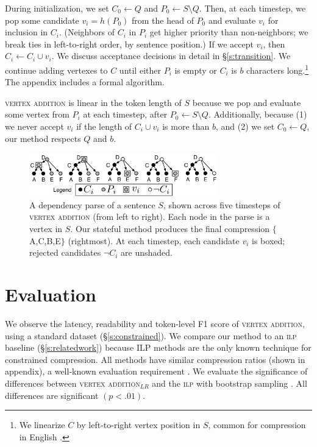 \documentclass[11pt,a4paper]{article}
\begin{document}
During initialization, we set $C_0 \gets Q$ and $P_0 \gets S \setminus Q$. Then, at each timestep, we pop some candidate $v_i =h(P_0)$ from the head of $P_0$ and evaluate $v_i$ for inclusion in $C_i$. (Neighbors of $C_i$ in $P_i$ get higher priority than non-neighbors; we break ties in left-to-right order, by sentence position.) If we accept $v_i$, then $C_i \gets C_i \cup v_i$. We discuss acceptance decisions in detail in \S\ref{s:transition}. We continue adding vertexes to $C$ until either $P_i$ is empty or $C_i$ is $b$ characters long.\footnote{We linearize $C$ by left-to-right vertex position in $S$, common for compression in English \cite{filippova2013overcoming}.} The appendix includes a formal algorithm. 

\textsc{vertex addition} is linear in the token length of $S$ because we pop and evaluate some vertex from $P_i$ at each timestep, after $P_0  \gets S \setminus Q$. Additionally, because (1) we never accept $v_i$ if the length of $C_i \cup v_i$ is more than $b$, and (2) we set $C_0 \gets Q$, our method respects $Q$ and $b$.

\begin{figure}[h]
\includegraphics[width=8.2cm]{additive.pdf}
\caption{A dependency parse of a sentence $S$, shown across five timesteps of \textsc{vertex addition} (from left to right). Each node in the parse is a vertex in $S$. Our stateful method produces the final compression $\{$A,C,B,E$\}$ (rightmost). At each timestep, each candidate $v_i$ is boxed; rejected candidates $\neg C_i$ are unshaded.}
\label{f:walkthru}
\end{figure}

\section{Evaluation}\label{s:autoeval}

We observe the latency, readability and token-level F1 score of \textsc{vertex addition}, using a standard dataset (\S\ref{s:constrained}).
We compare our method to an \textsc{ilp} baseline (\S\ref{s:relatedwork}) because ILP methods are the only known technique for constrained compression. All methods have similar compression ratios (shown in appendix), a well-known evaluation requirement \cite{napoles2011evaluating}. We evaluate the significance of differences between \textsc{vertex addition}$_{LR}$ and the \textsc{ilp} with bootstrap sampling \cite{D12-1091}. All differences are significant {\small $(p < .01)$}. 
\end{document}
